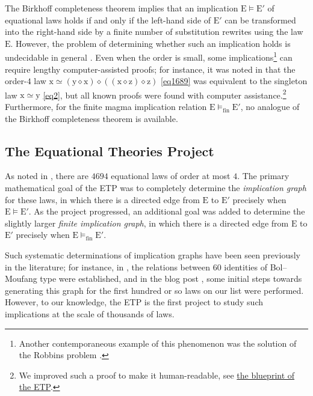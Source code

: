 \documentclass[12pt]{amsart}
\theoremstyle{definition}
\newcommand{\x}{\mathrm{x}}
\newcommand{\y}{\mathrm{y}}
\newcommand{\z}{\mathrm{z}}
\newcommand{\op}{\diamond}
\newcommand{\formaleq}{\simeq}
\newcommand{\modelsfin}{\models_{\mathrm{fin}}}
\newcommand{\E}{\mathrm{E}}
\begin{document}
The Birkhoff completeness theorem \cite[Th.~3.5.14]{term-rewriting} implies that an implication ${\E} \models {\E'}$ of equational laws holds if and only if the left-hand side of ${\E'}$ can be transformed into the right-hand side by a finite number of substitution rewrites using the law $\E$. However, the problem of determining whether such an implication holds is undecidable in general \cite{mckenzie}. Even when the order is small, some implications\footnote{Another contemporaneous example of this phenomenon was the solution of the Robbins problem \cite{robbins}.} can require lengthy computer-assisted proofs; for instance, it was noted in \cite{Kisielewicz2} that the order-$4$ law $\x \formaleq (\y \op \x) \op ((\x \op \z) \op \z)$ \eqref{eq1689} was equivalent to the singleton law $\x \formaleq \y$ \eqref{eq2}, but all known proofs were found with computer assistance.\footnote{We improved such a proof to make it human-readable, see \href{https://teorth.github.io/equational_theories/blueprint/implications-chapter.html}{the blueprint of the ETP}.}  Furthermore, for the finite magma implication relation ${\E} \modelsfin {\E'}$, no analogue of the Birkhoff completeness theorem is available.

\subsection{The Equational Theories Project}

As noted in , there are $\num{4694}$ equational laws of order at most $4$. The primary mathematical goal of the ETP was to completely determine the \emph{implication graph} for these laws, in which there is a directed edge from $\E$ to ${\E'}$ precisely when ${\E} \models {\E'}$. As the project progressed, an additional goal was added to determine the slightly larger \emph{finite implication graph}, in which there is a directed edge from $\E$ to ${\E'}$ precisely when ${\E} \modelsfin {\E'}$.

Such systematic determinations of implication graphs have been seen previously in the literature; for instance, in \cite{phillips-vojtechovsky}, the relations between $60$ identities of Bol--Moufang type were established, and in the blog post \cite[\S 17]{Wolfram_2022}, some initial steps towards generating this graph for the first hundred or so laws on our list were performed. However, to our knowledge, the ETP is the first project to study such implications at the scale of thousands of laws.
\end{document}
